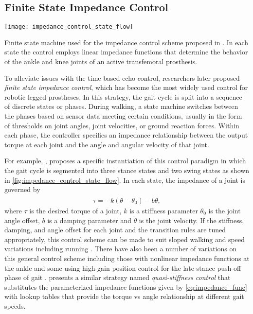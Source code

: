 \subsection{Finite State Impedance Control}\label{sec:back_walk_fsm}
\begin{marginfigure}
    \centering
    \texttt{[image: impedance\_control\_state\_flow]}
    \caption[Example finite state machine for the impedance control]{Finite
    state machine used for the impedance control scheme proposed in
    \citet{sup2009preliminary}. In each state the control employs linear
    impedance functions that determine the behavior of the ankle and knee joints
    of an active transfemoral
    prosthesis.}\label{fig:impedance_control_state_flow}
\end{marginfigure}
To alleviate issues with the time-based echo control, researchers later proposed
\emph{finite state impedance control}, which has become the most widely used
control for robotic legged prostheses. In this strategy, the gait cycle is split
into a sequence of discrete states or phases. During walking, a state machine
switches between the phases based on sensor data meeting certain conditions,
usually in the form of thresholds on joint angles, joint velocities, or ground
reaction forces. Within each phase, the controller specifies an impedance
relationship between the output torque at each joint and the angle and angular
velocity of that joint.

For example, \citet{sup2009preliminary}, proposes a specific instantiation of
this control paradigm in which the gait cycle is segmented into three stance
states and two swing states as shown in \cref{fig:impedance_control_state_flow}.
In each state, the impedance of a joint is governed by
\begin{align}
    \tau = -k (\theta - \theta_{0}) - b \dot \theta,\label{eq:impedance_func}
\end{align}
where $\tau$ is the desired torque of a joint, $k$ is a stiffness parameter
$\theta_{0}$ is the joint angle offset, $b$ is a damping parameter and $\dot
\theta$ is the joint velocity. If the stiffness, damping, and angle offset for
each joint and the transition rules are tuned appropriately, this control scheme
can be made to suit sloped walking \citep{sup2011upslope} and speed variations
\citep{shultz2016variable} including running \citep{shultz2015running}. There
have also been a number of variations on this general control scheme including
those with nonlinear impedance functions at the ankle
\citep{sup2007design,shultz2014walking} and some using high-gain position
control for the late stance push-off phase of gait \citep{lawson2014robotic}.
\citet{lenzi2014speed} presents a similar strategy named \emph{quasi-stiffness
control} that substitutes the parameterized impedance functions given by
\cref{eq:impedance_func} with lookup tables that provide the torque vs angle
relationship at different gait speeds. 

